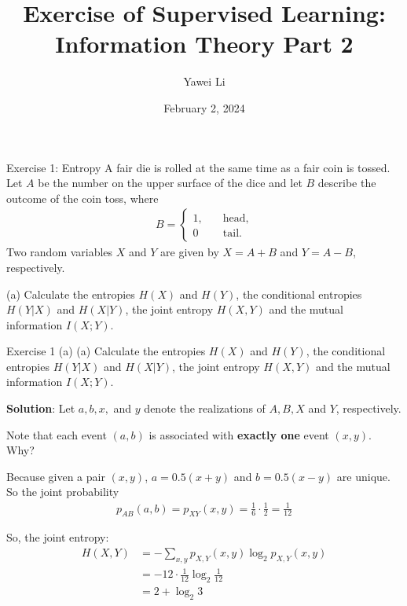 \documentclass[aspectratio=169]{beamer}
\title[]{\textbf{Exercise of Supervised Learning:\\Information Theory Part 2}}
\author{Yawei Li}
\institute[LMU]
{
\\
  \texttt{yawei.li@stat.uni-muenchen.de}
}
\date{February 2, 2024}
\begin{document}
\begin{frame}
\titlepage

\end{frame}

\begin{frame}{Exercise 1: Entropy}
	A fair die is rolled at the same time as a fair coin is tossed. Let $A$ be the number on the upper surface of the dice and let $B$ describe the outcome of the coin toss, where 
	\begin{align*}
		B = \begin{cases}
			1, \quad & \text{head,} \\
			0 \quad & \text{tail.}
		\end{cases}
	\end{align*}
	Two random variables $X$ and $Y$ are given by $X = A + B$ and $Y = A - B$, respectively.
	\vspace{10pt}
	
	(a) Calculate the entropies $H(X)$ and $H(Y)$, the conditional entropies $H(Y|X)$ and $H(X|Y)$, the joint entropy $H(X, Y)$ and the mutual information $I(X;Y)$.
\end{frame}

\begin{frame}{Exercise 1 (a)}
(a) Calculate the entropies $H(X)$ and $H(Y)$, the conditional entropies $H(Y|X)$ and $H(X|Y)$, the joint entropy $H(X, Y)$ and the mutual information $I(X;Y)$.

\textbf{Solution}: Let $a, b, x,$ and $y$ denote the realizations of $A, B, X$ and $Y$, respectively.

Note that each event $(a,b)$ is associated with \textbf{exactly one} event $(x,y)$. Why?

Because given a pair $(x, y)$, $a = 0.5 (x + y)$ and $b = 0.5 (x - y)$ are unique. 
So the joint probability
\begin{align*}
	p_{AB}(a, b) = p_{XY}(x, y) = \frac{1}{6} \cdot \frac{1}{2} = \frac{1}{12}
\end{align*}

So, the joint entropy:
\begin{align*}
	H(X, Y) &= - \sum_{x, y} p_{X, Y}(x,y) \log_2 p_{X, Y}(x, y) \\ 
	&= - 12 \cdot \frac{1}{12} \log_2 \frac{1}{12} \\ 
	&= 2 + \log_2 3
\end{align*}
	
\end{frame}
\end{document}

